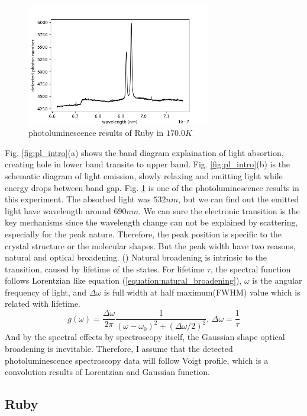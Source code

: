 \documentclass{article}
\begin{document}
 \begin{figure}[ht]
    \centering
    \includegraphics[width=8cm]{../results/Ruby(170.0)_raw_fig.png}
    \caption{photoluminescence results of Ruby in $170.0K$}
    \label{fig:pl_sample}
 \end{figure}
 Fig. \ref{fig:pl_intro}(a) shows the band diagram explaination of light absortion, creating hole in lower band transite to upper band.
 Fig. \ref{fig:pl_intro}(b) is the schematic diagram of light emission, slowly relaxing and emitting light while energy drops between band gap.
 Fig. \ref{fig:pl_sample} is one of the photoluminescence results in this experiment.
 The absorbed light was $532nm$, but we can find out the emitted light have wavelength around $690nm$.
 We can sure the electronic transition is the key mechanisms since the wavelength change can not be explained by scattering, especially for the peak nature.
 Therefore, the peak position is specific to the crystal structure or the molecular shapes.
 But the peak width have two reasons, natural and optical broadening. (\cite{quantum_optics})
 Natural broadening is intrinsic to the transition, caused by lifetime of the states.
 For lifetime $\tau$, the spectral function follows Lorentzian like equation (\ref{equation:natural_broadening}), $\omega$ is the angular frequency of light, and $\Delta \omega$ is full width at half maximum(FWHM) value which is related with lifetime.
 \begin{equation}
   g(\omega) = \frac{\Delta \omega}{2 \pi} \frac{1}{(\omega-\omega_0)^2 + (\Delta \omega/2)^2},\, \Delta \omega = \frac{1}{\tau}
   \label{equation:natural_broadening}
 \end{equation}
 And by the spectral effects by spectroscopy itself, the Gaussian shape optical broadening is inevitable.
 Therefore, I assume that the detected photoluminescence spectroscopy data will follow Voigt profile, which is a convolution results of Lorentzian and Gaussian function.
 \subsection{Ruby}
 \label{intro:ruby}
 
\end{document}
